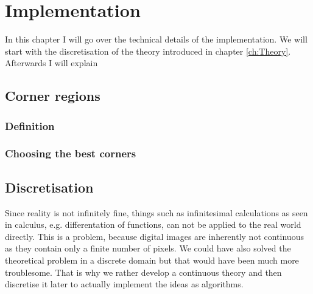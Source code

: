 \chapter{Implementation}

\label{ch:Implementation} 

In this chapter I will go over the technical details of the implementation. We will start with the
discretisation of the theory introduced in chapter \ref{ch:Theory}. Afterwards I will explain

\section{Corner regions}
\subsection{Definition}
\subsection{Choosing the best corners}
\section{Discretisation}

Since reality is not infinitely fine, things such as infinitesimal calculations as seen in 
calculus, e.g. differentation of functions, can not be applied to the real world directly.
This is a problem, because digital images are inherently not continuous as they contain only a
finite number of pixels. 
We could have also solved the theoretical problem in a discrete domain but that would have 
been much more troublesome.
That is why we rather develop a continuous theory and then discretise it later to actually
implement the ideas as algorithms.

